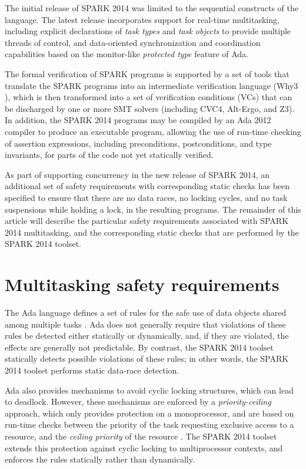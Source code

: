 \documentclass[conference,compsoc]{IEEEtran}
\begin{document}
The initial release of SPARK 2014 was limited to the sequential constructs
of the language. The latest release incorporates support for real-time
multitasking, including explicit declarations of \emph{task types} and
\emph{task objects} to provide multiple threads of control, and
data-oriented synchronization and coordination capabilities based on the
monitor-like \emph{protected type} feature of Ada.

The formal verification of SPARK programs is supported by a set of tools
that translate the SPARK programs into an intermediate verification
language (Why3 \cite{why3}), which is then transformed into a set of
verification conditions (VCs) that can be discharged by one or more SMT
solvers \cite{smt} (including CVC4, Alt-Ergo, and Z3). In addition, the
SPARK 2014 programs may be compiled by an Ada 2012 compiler to produce an
executable program, allowing the use of run-time checking of assertion
expressions, including preconditions, postconditions, and type invariants,
for parts of the code not yet statically verified.

As part of supporting concurrency in the new release of SPARK 2014, an
additional set of safety requirements with corresponding static checks has
been specified to ensure that there are no data races, no locking cycles,
and no task suspensions while holding a lock, in the resulting programs.
The remainder of this article will describe the particular safety
requirements associated with SPARK 2014 multitasking, and the corresponding
static checks that are performed by the SPARK 2014 toolset.

\section{Multitasking safety requirements}
The Ada language defines a set of rules for the safe use of data objects
shared among multiple tasks \cite{lrm}. Ada does not generally require that
violations of these rules be detected either statically or dynamically,
and, if they are violated, the effects are generally not predictable. By
contrast, the SPARK 2014 toolset statically detects possible violations of
these rules; in other words, the SPARK 2014 toolset performs static
data-race detection.

Ada also provides mechanisms to avoid cyclic locking structures, which can
lead to deadlock. However, these mechanisms are enforced by a
\emph{priority-ceiling} approach, which only provides protection on a
monoprocessor, and are based on run-time checks between the priority of the
task requesting exclusive access to a resource, and the \emph{ceiling
  priority} of the resource \cite{mccormick2011building}. The SPARK 2014
toolset extends this protection against cyclic locking to multiprocessor
contexts, and enforces the rules statically rather than dynamically.
\end{document}
